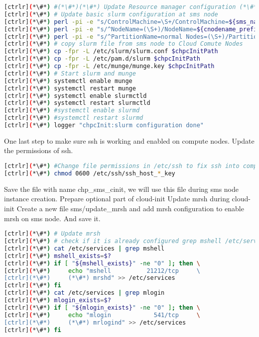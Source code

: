 \begin{lstlisting}[language=bash,keywords={}]
[ctrlr](*\#*) #(*\#*)(*\#*) Update Resource manager configuration (*\#*)(*\#*)(*\#*)
[ctrlr](*\#*) # Update basic slurm configuration at sms node
[ctrlr](*\#*) perl -pi -e "s/ControlMachine=\S+/ControlMachine=${sms_name}/" /etc/slurm/slurm.conf
[ctrlr](*\#*) perl -pi -e "s/^NodeName=(\S+)/NodeName=${cnodename_prefix}[1-${num_ccomputes}]/" /etc/slurm/slurm.conf
[ctrlr](*\#*) perl -pi -e "s/^PartitionName=normal Nodes=(\S+)/PartitionName=normal Nodes=${cnodename_prefix}[1-${num_ccomputes}]/" /etc/slurm/slurm.conf
[ctrlr](*\#*) # copy slurm file from sms node to Cloud Comute Nodes
[ctrlr](*\#*) cp -fpr -L /etc/slurm/slurm.conf $chpcInitPath
[ctrlr](*\#*) cp -fpr -L /etc/pam.d/slurm $chpcInitPath
[ctrlr](*\#*) cp -fpr -L /etc/munge/munge.key $chpcInitPath
[ctrlr](*\#*) # Start slurm and munge 
[ctrlr](*\#*) systemctl enable munge
[ctrlr](*\#*) systemctl restart munge
[ctrlr](*\#*) systemctl enable slurmctld
[ctrlr](*\#*) systemctl restart slurmctld
[ctrlr](*\#*) #systemctl enable slurmd
[ctrlr](*\#*) #systemctl restart slurmd
[ctrlr](*\#*) logger "chpcInit:slurm configuration done"
\end{lstlisting} 


One last step to make sure ssh is working and enabled on compute nodes. Update the permissions of ssh.


\begin{lstlisting}[language=bash,keywords={}]
[ctrlr](*\#*) #Change file permissions in /etc/ssh to fix ssh into compute node
[ctrlr](*\#*) chmod 0600 /etc/ssh/ssh_host_*_key
\end{lstlisting} 

Save the file with name chp\_sms\_cinit, we will use this file during sms node instance creation.
Prepare optional part of cloud-init
Update mrsh during cloud-init 
Create a new file sms/update\_mrsh and add mrsh configuration to enable mrsh on sms node. And save it. 



\begin{lstlisting}[language=bash,keywords={}]
[ctrlr](*\#*) # Update mrsh
[ctrlr](*\#*) # check if it is already configured grep mshell /etc/services will [ctrlr](*\#*) return non-zero, else configure"
[ctrlr](*\#*) cat /etc/services | grep mshell
[ctrlr](*\#*) mshell_exists=$?
[ctrlr](*\#*) if [ "${mshell_exists}" -ne "0" ]; then \
[ctrlr](*\#*)     echo "mshell          21212/tcp     \             
[ctrlr](*\#*)     (*\#*) mrshd" >> /etc/services
[ctrlr](*\#*) fi
[ctrlr](*\#*) cat /etc/services | grep mlogin
[ctrlr](*\#*) mlogin_exists=$?
[ctrlr](*\#*) if [ "${mlogin_exists}" -ne "0" ]; then \
[ctrlr](*\#*)     echo "mlogin            541/tcp     \
[ctrlr](*\#*)     (*\#*) mrlogind" >> /etc/services
[ctrlr](*\#*) fi
\end{lstlisting} 


